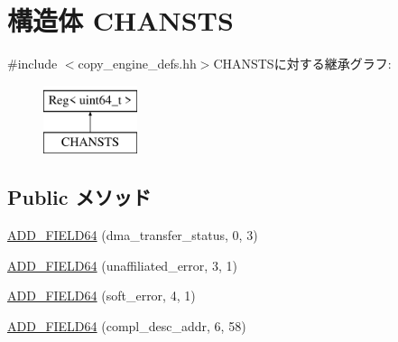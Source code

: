 \hypertarget{structCopyEngineReg_1_1ChanRegs_1_1CHANSTS}{
\section{構造体 CHANSTS}
\label{structCopyEngineReg_1_1ChanRegs_1_1CHANSTS}
}


{\ttfamily \#include $<$copy\_\-engine\_\-defs.hh$>$}CHANSTSに対する継承グラフ:\begin{figure}[H]
\begin{center}
\leavevmode
\includegraphics[height=2cm]{structCopyEngineReg_1_1ChanRegs_1_1CHANSTS}
\end{center}
\end{figure}
\subsection*{Public メソッド}
\begin{DoxyCompactItemize}
\item 
\hyperlink{structCopyEngineReg_1_1ChanRegs_1_1CHANSTS_aef825b8d8542668f738252a6c335b8b2}{ADD\_\-FIELD64} (dma\_\-transfer\_\-status, 0, 3)
\item 
\hyperlink{structCopyEngineReg_1_1ChanRegs_1_1CHANSTS_a39993358411b9f2d330aa59f45333812}{ADD\_\-FIELD64} (unaffiliated\_\-error, 3, 1)
\item 
\hyperlink{structCopyEngineReg_1_1ChanRegs_1_1CHANSTS_ab2a8aa3ab70c3e2755868a2f767127f0}{ADD\_\-FIELD64} (soft\_\-error, 4, 1)
\item 
\hyperlink{structCopyEngineReg_1_1ChanRegs_1_1CHANSTS_a40a7ae0f8feca99643b501a3efbc9250}{ADD\_\-FIELD64} (compl\_\-desc\_\-addr, 6, 58)
\end{DoxyCompactItemize}



